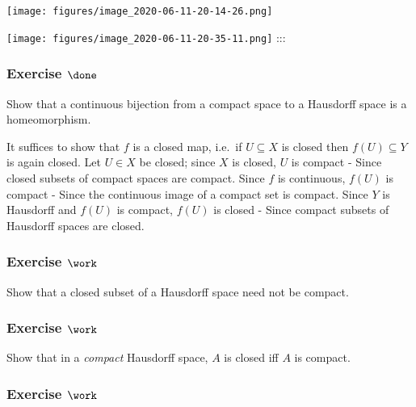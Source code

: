 \texttt{[image: figures/image\_2020-06-11-20-14-26.png]}

\texttt{[image: figures/image\_2020-06-11-20-35-11.png]} :::

\hypertarget{exercise-done-3}{%
\subsubsection{\texorpdfstring{Exercise
\(\done\)}{Exercise \textbackslash done}}\label{exercise-done-3}}

Show that a continuous bijection from a compact space to a Hausdorff
space is a homeomorphism.

\begin{solution}

\hfill

\begin{concept}

\hfill

\end{concept}

It suffices to show that \(f\) is a closed map, i.e.~if \(U\subseteq X\)
is closed then \(f(U)\subseteq Y\) is again closed. Let \(U\in X\) be
closed; since \(X\) is closed, \(U\) is compact - Since closed subsets
of compact spaces are compact. Since \(f\) is continuous, \(f(U)\) is
compact - Since the continuous image of a compact set is compact. Since
\(Y\) is Hausdorff and \(f(U)\) is compact, \(f(U)\) is closed - Since
compact subsets of Hausdorff spaces are closed.

\end{solution}

\hypertarget{exercise-work-39}{%
\subsubsection{\texorpdfstring{Exercise
\(\work\)}{Exercise \textbackslash work}}\label{exercise-work-39}}

Show that a closed subset of a Hausdorff space need not be compact.

\hypertarget{exercise-work-40}{%
\subsubsection{\texorpdfstring{Exercise
\(\work\)}{Exercise \textbackslash work}}\label{exercise-work-40}}

Show that in a \emph{compact} Hausdorff space, \(A\) is closed iff \(A\)
is compact.

\hypertarget{exercise-work-41}{%
\subsubsection{\texorpdfstring{Exercise
\(\work\)}{Exercise \textbackslash work}}\label{exercise-work-41}}

